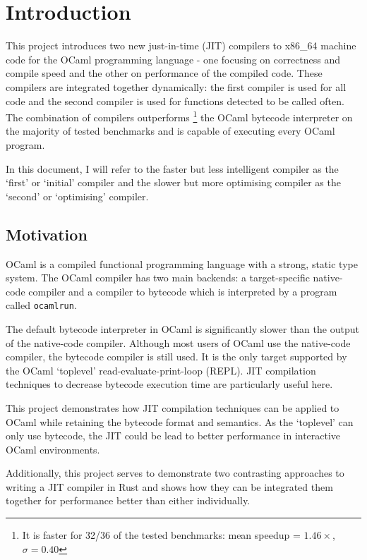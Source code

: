 \chapter{Introduction}

This project introduces two new just-in-time (JIT) compilers to x86\_64 machine code for the OCaml
programming language - one focusing on correctness and compile speed and the other on performance
of the compiled code. These compilers are integrated together dynamically: the first compiler is
used for all code and the second compiler is used for functions detected to be called often.  The
combination of compilers outperforms \footnote{It is faster for 32/36 of the tested benchmarks:
      mean speedup = $1.46\times$, $\sigma = 0.40$} the OCaml bytecode interpreter on the majority of
tested benchmarks and is capable of executing every OCaml program.

In this document, I will refer to the faster but less intelligent compiler as the `first' or
`initial' compiler and the slower but more optimising compiler as the `second' or `optimising'
compiler.

\section{Motivation}

OCaml is a compiled functional programming language with a strong, static type system. The OCaml
compiler has two main backends: a target-specific native-code compiler and a compiler to
bytecode which is interpreted by a program called \texttt{ocamlrun}.

The default bytecode interpreter in OCaml is significantly slower than the output of the
native-code compiler. Although most users of OCaml use the native-code compiler, the bytecode
compiler is
still used. It is the only target supported by the OCaml `toplevel' read-evaluate-print-loop
(REPL).
JIT compilation techniques to decrease bytecode execution time are particularly useful here.

This project demonstrates how JIT compilation techniques can be applied to OCaml while retaining
the bytecode format and semantics. As the `toplevel' can only use
bytecode, the JIT could be lead to better performance in interactive OCaml environments.

Additionally, this project serves to demonstrate two contrasting approaches to writing a JIT
compiler in Rust and shows how they can be integrated them together for performance better than
either individually.

